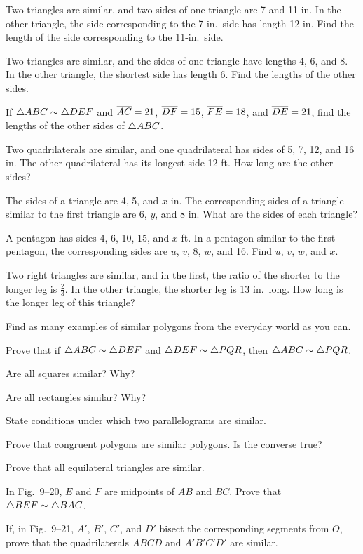 \documentclass[11pt]{book}
\begin{document}
\begin{exercisecols}
\begin{exlist}
\item Two triangles are similar, and two sides of one triangle are 7 and 11 in.
      In the other triangle, the side corresponding to the 7-in.\ side has length
      12 in. Find the length of the side corresponding to the 11-in.\ side.
\item Two triangles are similar, and the sides of one triangle have lengths 4, 6,
      and 8. In the other triangle, the shortest side has length 6. Find the
      lengths of the other sides.
\item If $\triangle ABC \sim \triangle DEF$ and $\overline{AC} = 21$, $\overline{DF} = 15$,
      $\overline{FE} = 18$, and $\overline{DE} = 21$, find the lengths of the other sides of
      $\triangle ABC$.
\item Two quadrilaterals are similar, and one quadrilateral has sides of 5, 7,
      12, and 16 in. The other quadrilateral has its longest side 12 ft. How long
      are the other sides?
\item The sides of a triangle are 4, 5, and $x$ in. The corresponding sides of a
      triangle similar to the first triangle are 6, $y$, and 8 in. What are the
      sides of each triangle?
\item A pentagon has sides 4, 6, 10, 15, and $x$ ft. In a pentagon similar to the
      first pentagon, the corresponding sides are $u$, $v$, 8, $w$, and 16. Find
      $u$, $v$, $w$, and $x$.
\item Two right triangles are similar, and in the first, the ratio of the shorter
      to the longer leg is $\frac{2}{3}$. In the other triangle, the shorter leg
      is 13 in.\ long. How long is the longer leg of this triangle?
\item Find as many examples of similar polygons from the everyday world as you
      can.
\item Prove that if $\triangle ABC \sim \triangle DEF$ and $\triangle DEF \sim
      \triangle PQR$, then $\triangle ABC \sim \triangle PQR$.
\item Are all squares similar? Why?
\item Are all rectangles similar? Why?
\item State conditions under which two parallelograms are similar.
\item Prove that congruent polygons are similar polygons. Is the converse true?
\item Prove that all equilateral triangles are similar.
\item In Fig.~9--20, $E$ and $F$ are midpoints of $AB$ and $BC$. Prove that
      $\triangle BEF \sim \triangle BAC$.
\exfig{\FIGIXTWENTY}
\item If, in Fig.~9--21, $A'$, $B'$, $C'$, and $D'$ bisect the corresponding
      segments from $O$, prove that the quadrilaterals $ABCD$ and $A'B'C'D'$ are
      similar.
\exfig{\FIGIXTWENTYONE}
\end{exlist}
\end{exercisecols}
\end{document}
